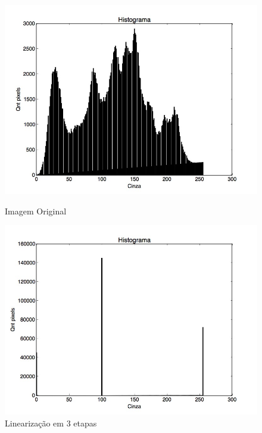 \documentclass{article}
\begin{document}
\FloatBarrier
\begin{figure}[!htb]
\begin{minipage}[b]{0.45\linewidth}
\centering
\includegraphics[scale=0.25]{Histo_lena_B.jpg}
\caption{Imagem Original}
\label{fig:original}
\end{minipage}
\hspace{0.5cm}
\begin{minipage}[b]{0.45\linewidth}
\centering
\includegraphics[scale=0.25]{Histo_LinearizacaoMultipla.jpg}
\caption{Linearização em 3 etapas}
\label{fig:rota}
\end{minipage}
\end{figure}
\FloatBarrier
\end{document}
